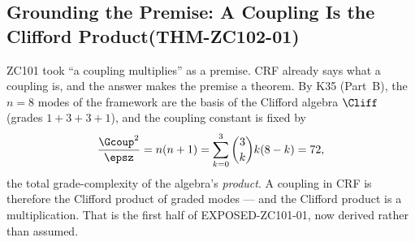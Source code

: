 \documentclass[12pt, a4paper]{article}
\begin{document}
\newpage

\subsection{Grounding the Premise: A Coupling Is the Clifford Product\quad(THM-ZC102-01)}
\label{sec:premise-zc102}

ZC101 took ``a coupling multiplies'' as a premise. CRF already says what a
coupling is, and the answer makes the premise a theorem. By K35 (Part~B), the
$n=8$ modes of the framework are the basis of the Clifford algebra $\Cliff$
(grades $1{+}3{+}3{+}1$), and the coupling constant is fixed by
\[
  \frac{\Gcoup^2}{\epsz} = n(n+1) = \sum_{k=0}^{3}\binom{3}{k}k(8-k) = 72,
\]
the total grade-complexity of the algebra's \emph{product}. A coupling in CRF is
therefore the Clifford product of graded modes --- and the Clifford product is a
multiplication. That is the first half of EXPOSED-ZC101-01, now derived rather
than assumed.

\end{document}
